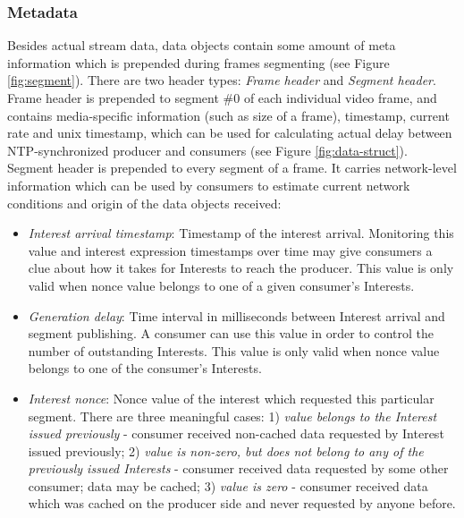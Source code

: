 \documentclass{icn/sig-alternate-2012} %
\begin{document}
\subsubsection{Metadata}

Besides actual stream data, data objects contain some amount of meta information which is prepended during frames segmenting (see Figure \ref{fig:segment}). There are two header types: \textit{Frame header} and \textit{Segment header}. Frame header is prepended to segment \#0 of each individual video frame, and contains media-specific information (such as size of a frame), timestamp, current rate and unix timestamp, which can be used for calculating actual delay between NTP-synchronized producer and consumers (see Figure \ref{fig:data-struct}). Segment header is prepended to every segment of a frame. It carries network-level information which can be used by consumers to estimate current network conditions and origin of the data objects received:
\begin{itemize} [label={}]

\item \textit{Interest arrival timestamp}: Timestamp of the interest arrival. Monitoring this value and interest expression timestamps over time may give consumers a clue about how it takes for Interests to reach the producer. This value is only valid when nonce value belongs to one of a given consumer's Interests.

\item \textit{Generation delay}: Time interval in milliseconds between Interest arrival and segment publishing. A consumer can use this value in order to control the number of outstanding Interests. This value is only valid when nonce value belongs to one of the consumer's Interests.

\item \textit{Interest nonce}: Nonce value of the interest which requested this particular segment. There are three meaningful cases:  1) \textit{value belongs to the Interest issued previously} - consumer received non-cached data requested by Interest issued previously; 2) \textit{value is non-zero, but does not belong to any of the previously issued Interests} - consumer received data requested by some other consumer; data may be cached; 3) \textit{value is zero} - consumer received data which was cached on the producer side and never requested by anyone before.

\end{itemize}
\end{document}

